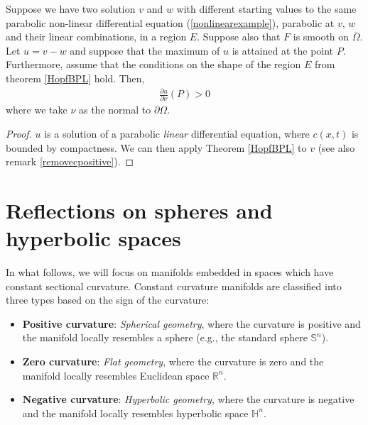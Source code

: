 \begin{proposition}
	\label{secondapplication}
	Suppose we have two solution $v$ and $w$ with different starting values to the same parabolic non-linear differential equation (\ref{nonlinearexample}), parabolic at $v$, $w$ and their linear combinations, in a region $E$. Suppose also that $F$ is smooth on  $\overline{\Omega}$. Let $u=v-w$ and suppose that the maximum of $u$ is attained at the point $P$. Furthermore, assume that the conditions on the shape of the region $E$ from theorem \ref{HopfBPL} hold. Then, 
	\begin{align*}
		\frac{\partial u}{\partial \nu}(P) >0
	\end{align*}
	where we take $\nu$ as the normal to $\partial\Omega$.
\end{proposition}

\begin{proof}
	$u$ is a solution of a parabolic \textit{linear} differential equation, where  $c(x, t)$ is bounded by compactness. We can then apply Theorem \ref{HopfBPL} to $v$ (see also remark \ref{removecpositive}).
\end{proof}
\section{Reflections on spheres and hyperbolic spaces}	
\label{reflections definitions}

In what follows, we will focus on manifolds embedded in spaces which have constant sectional curvature. Constant curvature manifolds are classified into three types based on the sign of the curvature:
\begin{itemize}
	\item \textbf{Positive curvature}: \textit{Spherical geometry}, where the curvature is positive and the manifold locally resembles a sphere (e.g., the standard sphere $\mathbb{S}^n$).
	\item \textbf{Zero curvature}: \textit{Flat geometry}, where the curvature is zero and the manifold locally resembles Euclidean space $\mathbb{R}^n$.
	\item \textbf{Negative curvature}: \textit{Hyperbolic geometry}, where the curvature is negative and the manifold locally resembles hyperbolic space $\mathbb{H}^n$.
\end{itemize}

